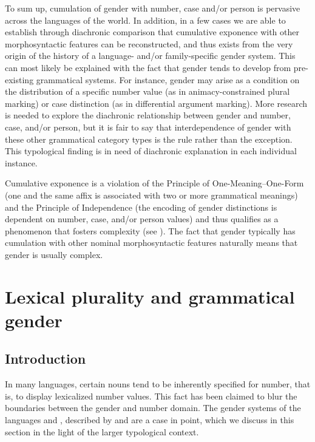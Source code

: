 \documentclass[output=collectionpaper]{langsci/langscibook}
\begin{document}
To sum up, cumulation of gender with number, case and/or person is pervasive across the languages of the world. In addition, in a few cases we are able to establish through diachronic comparison that cumulative exponence with other morphosyntactic features can be reconstructed, and thus exists from the very origin of the history of a language- and/or family-specific gender system. This can most likely be explained with the fact that gender tends to develop from pre-existing grammatical systems. For instance, gender may arise as a condition on the distribution of a specific number value (as in animacy-constrained plural marking) or case distinction (as in differential argument marking). More research is needed to explore the diachronic relationship between gender and number, case, and/or person, but it is fair to say that interdependence of gender with these other grammatical category types is the rule rather than the exception. This typological finding is in need of diachronic explanation in each individual instance.

Cumulative exponence is a violation of the Principle of One-Meaning--One-Form (one and the same affix is associated with two or more grammatical meanings) and the Principle of Independence (the encoding of gender distinctions is dependent on number, case, and/or person values) and thus qualifies as a phenomenon that fosters complexity (see ). The fact that gender typically has cumulation with other nominal morphosyntactic features naturally means that gender is usually complex.

\section{Lexical plurality and grammatical gender}\label{sec:WDG:9}

\subsection{Introduction}\label{sec:WDG:9.1}
In many languages, certain nouns tend to be inherently specified for number, that is, to display lexicalized number values. This fact has been claimed to blur the boundaries between the gender and number domain. The gender systems of the  languages  and , described by  and  are a case in point, which we discuss in this section in the light of the larger typological context.
\end{document}
